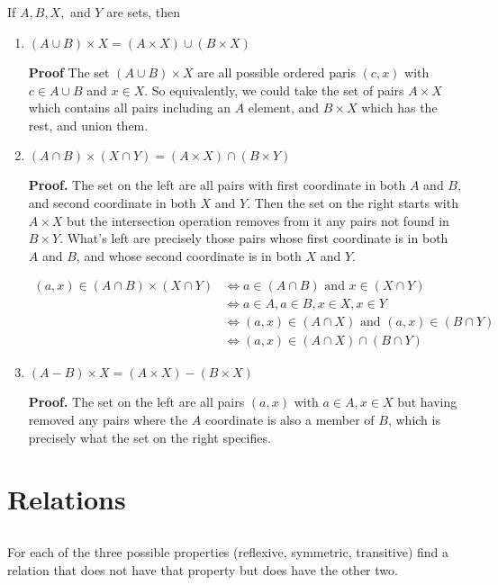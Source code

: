 \documentclass{article}
\newcommand{\tand}{\text{ and }}
\begin{document}
\subsection{} If $A, B, X,$ and $Y$ are sets, then
\begin{enumerate}[i]
    \item $(A \cup B) \times X = (A \times X) \cup (B \times X)$

    \textbf{Proof} The set $(A \cup B) \times X$ are all possible ordered paris $(c, x)$ with $c \in A \cup B$ and $x \in X$. So equivalently, we could take the set of pairs $A \times X$ which contains all pairs including an $A$ element, and $B \times X$ which has the rest, and union them.

    \item $(A \cap B) \times (X \cap Y) = (A \times X) \cap (B \times Y)$
    
    \textbf{Proof.} The set on the left are all pairs with first coordinate in both $A$ and $B$, and second coordinate in both $X$ and $Y$. Then the set on the right starts with $A \times X$ but the intersection operation removes from it any pairs not found in $B \times Y$. What's left are precisely those pairs whose first coordinate is in both $A$ and $B$, and whose second coordinate is in both $X$ and $Y$.

    \begin{align*}
        (a, x) \in (A \cap B) \times (X \cap Y) &\iff a \in (A \cap B) \tand x \in (X \cap Y)\\
        &\iff a \in A, a \in B, x \in X, x \in Y\\
        &\iff (a, x) \in (A \cap X) \tand (a, x) \in (B \cap Y)\\
        &\iff (a, x) \in (A \cap X) \cap (B \cap Y) 
    \end{align*}
    
    \item $(A - B) \times X = (A \times X) - (B \times X)$
    
    \textbf{Proof.} The set on the left are all pairs $(a, x)$ with $a \in A, x \in X$ but having removed any pairs where the $A$ coordinate is also a member of $B$, which is precisely what the set on the right specifies.
\end{enumerate}
    
\section{Relations}

\subsection{} For each of the three possible properties (reflexive, symmetric, transitive) find a relation that does not have that property but does have the other two. 
\end{document}
